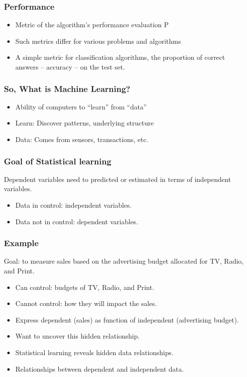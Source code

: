 \begin{frame}[fragile]\frametitle{Performance}
\begin{itemize}
\item Metric of the algorithm's performance evaluation P
\item Such metrics differ for various problems and algorithms
\item A simple metric for classification algorithms, the proportion of correct answers – accuracy – on the test set.
\end{itemize}
\end{frame}


\begin{frame}[fragile]\frametitle{So, What is Machine Learning?}
\begin{itemize}
\item Ability of computers to ``learn'' from ``data''
\item Learn: Discover patterns, underlying structure  
\item Data: Comes from sensors, transactions, etc.
\end{itemize}
\end{frame}


\begin{frame}[fragile]\frametitle{Goal of Statistical learning}
Dependent variables need to predicted or estimated in terms of independent variables.

	\begin{itemize}
	\item Data in control: independent variables.
	\item Data not in control: dependent variables.
	\end{itemize}
\end{frame}

\begin{frame}[fragile]\frametitle{Example}
 Goal: to measure sales based on the advertising budget allocated for TV, Radio, and Print.
\begin{itemize}
\item Can control: budgets of TV, Radio, and Print. 
\item Cannot control: how they will impact the sales. 
\item Express dependent (sales) as function of independent (advertising budget). 
\item Want to uncover this hidden relationship.
\item Statistical learning reveals hidden data relationships. 
\item Relationships between dependent and independent data.
\end{itemize}
\end{frame}

